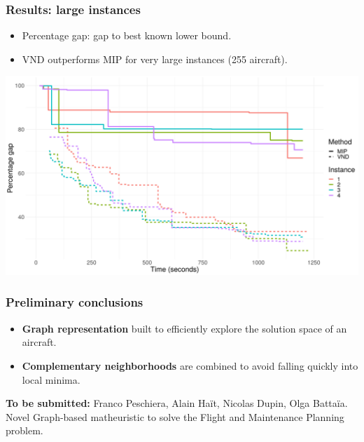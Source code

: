 \begin{frame}
\frametitle{\textbf{Results: large instances}}
  \begin{itemize}
    \item Percentage gap: gap to best known lower bound.
    \item VND outperforms MIP for very large instances (255 aircraft).
  \end{itemize}

  \includegraphics[width=\linewidth]{images/progress_gaps_very_large_255.png}  
\end{frame}

\begin{frame}[t]
\frametitle{\textbf{Preliminary conclusions}}
  \pause
    \begin{itemize}[<+->]
    \item \textbf{Graph representation} 
      built to efficiently explore the solution space of an aircraft.
    \item \textbf{Complementary neighborhoods} 
      are combined to avoid falling quickly into local minima.
    \end{itemize}
  \pause
  \textbf{To be submitted:} Franco Peschiera, Alain Haït, Nicolas Dupin, Olga Battaïa. Novel Graph-based matheuristic to solve the Flight and Maintenance Planning problem.
\end{frame}

